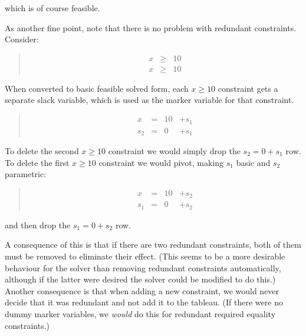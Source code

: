 \documentclass{article}
\begin{document}
which is of course feasible.

As another fine point, note that there is no problem with redundant
constraints.  Consider:

\begin{quote}\vspace*{-1ex}
$$
\begin{array}{rlrrr} 
x & \geq & 10   \\
x & \geq & 10 
\end{array}
$$
\end{quote}\vspace{-0.9ex}

When converted to basic feasible solved form, each $x \geq 10$ constraint
gets a separate slack variable, which is used as the marker variable for
that constraint.


\begin{quote}\vspace*{-1ex}
$$
\begin{array}{rlrrr} 
x & = & 10 & + s_1   \\ \hline
s_2 & = & 0 & + s_1 
\end{array}
$$
\end{quote}\vspace{-0.9ex}

To delete the second $x \geq 10$ constraint we would simply drop
the $s_2 = 0 + s_1$ row.  To delete the first  $x \geq 10$ constraint we
would pivot, making $s_1$ basic and $s_2$ parametric:

\begin{quote}\vspace*{-1ex}
$$
\begin{array}{rlrrr}
x & = & 10 & + s_2   \\ \hline
s_1 & = & 0 & + s_2
\end{array}
$$
\end{quote}\vspace{-0.9ex}

and then drop the  $s_1 = 0 + s_2$ row.

A consequence of this is that if there are two redundant constraints, both
of them must be removed to eliminate their effect.  (This seems to be a
more desirable behaviour for the solver than removing redundant constraints
automatically, although if the latter were desired the solver could be
modified to do this.)  Another consequence is that when adding a new
constraint, we would never decide that it was redundant and not add it to
the tableau.  (If there were no dummy marker variables, we {\em would} do this
for redundant required equality constraints.)
\end{document}
